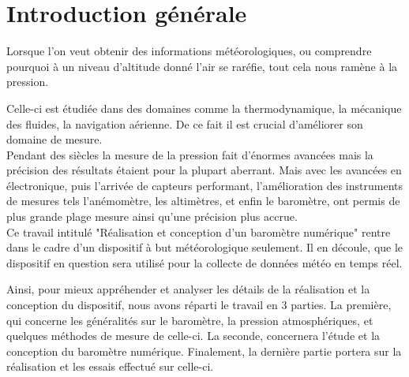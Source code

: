 \chapter*{Introduction générale}
 
	Lorsque l'on veut obtenir des informations météorologiques, ou comprendre pourquoi à un niveau d'altitude donné l'air se raréfie, tout cela nous ramène à la pression.

Celle-ci est étudiée dans des domaines comme la thermodynamique, la mécanique des fluides, la navigation aérienne. De ce fait il est crucial d'améliorer son domaine de mesure.\\

Pendant des siècles la mesure de la pression fait d'énormes avancées mais la précision des résultats étaient pour la plupart aberrant. Mais avec les avancées en électronique, puis l'arrivée de capteurs performant, l'amélioration des instruments de mesures tels l'anémomètre, les altimètres, et enfin le baromètre, ont permis de plus grande plage mesure ainsi qu'une précision plus accrue.\\

Ce travail intitulé "Réalisation et conception d'un baromètre numérique" rentre dans le cadre d'un dispositif à but météorologique seulement. Il en découle, que le dispositif en question sera utilisé pour la collecte de données météo en temps réel.

Ainsi, pour mieux appréhender et analyser les détails de la réalisation et la conception du dispositif, nous avons réparti le travail en 3 parties. La première, qui concerne les généralités sur le baromètre, la pression atmosphériques, et quelques méthodes de mesure de celle-ci. La seconde, concernera l'étude et la conception du baromètre numérique. Finalement, la dernière partie portera sur la réalisation et les essais effectué sur celle-ci.     
    
\setcounter{page}{1}       





